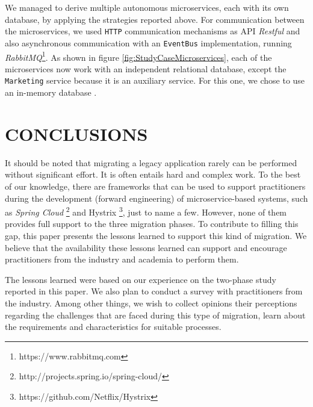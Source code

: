 \documentclass[a4paper,twoside]{article}
\begin{document}
We managed to derive multiple autonomous microservices, each with its own database, by applying the strategies reported above. For communication between the microservices, we used \texttt{HTTP} communication mechanisms as API \textit{Restful} and also asynchronous communication with an \texttt{EventBus} implementation, running \textit{RabbitMQ}\footnote{https://www.rabbitmq.com}. As shown in figure \ref{fig:StudyCaseMicroservices}, each of the microservices now work with an independent relational database, except the \texttt{Marketing} service because it is an auxiliary service. For this one, we chose to use an in-memory database \cite{henriqueITNG2019expReport}.

\section{\uppercase{Conclusions}}
\label{sec:Conclusions}

\noindent It should be noted that migrating a legacy application rarely can be performed without significant effort. It is often entails hard and complex work. To the best of our knowledge, there are frameworks that can be used to support practitioners during the development (forward engineering) of microservice-based systems, such as \textit{Spring Cloud} \footnote{http://projects.spring.io/spring-cloud/} and Hystrix \footnote{https://github.com/Netflix/Hystrix}, just to name a few. However, none of them provides full support to the three migration phases. To contribute to filling this gap, this paper presents the lessons learned to support this kind of migration. We believe that the availability these lessons learned can support and encourage practitioners from the industry and academia to perform them.

The lessons learned were based on our experience on the two-phase study reported in this paper. We also plan to conduct a survey with practitioners from the industry. Among other things, we wish to collect opinions their perceptions regarding the challenges that are faced during this type of migration, learn about the requirements and characteristics for suitable processes.



\end{document}
